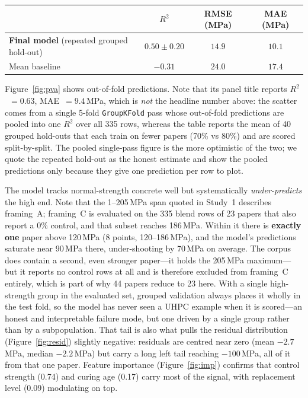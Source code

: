 \documentclass[11pt]{article}
\newcommand{\R}{$R^2$}
\begin{document}
\begin{center}\small
\begin{tabular}{lccc}
\toprule
 & \R{} & RMSE (MPa) & MAE (MPa) \\
\midrule
\textbf{Final model} (repeated grouped hold-out) & $\mathbf{0.50\pm0.20}$ & $\mathbf{14.9}$ & $\mathbf{10.1}$ \\
Mean baseline & $-0.31$ & $24.0$ & $17.4$ \\
\bottomrule
\end{tabular}
\end{center}

Figure~\ref{fig:pva} shows out-of-fold predictions. Note that its panel title reports
\R{}~$=0.63$, MAE~$=9.4$\,MPa, which is \emph{not} the headline number above: the
scatter comes from a single 5-fold \texttt{GroupKFold} pass whose out-of-fold
predictions are pooled into one \R{} over all 335 rows, whereas the table reports the
mean of 40 grouped hold-outs that each train on fewer papers (70\% vs 80\%) and are
scored split-by-split. The pooled single-pass figure is the more optimistic of the two;
we quote the repeated hold-out as the honest estimate and show the pooled predictions
only because they give one prediction per row to plot.

The model tracks normal-strength concrete well but systematically
\emph{under-predicts} the high end. Note that the 1--205\,MPa span quoted in Study~1
describes framing~A; framing~C is evaluated on the 335 blend rows of 23 papers that
also report a 0\% control, and that subset reaches 186\,MPa. Within it there is
\textbf{exactly one} paper above 120\,MPa (8 points, 120--186\,MPa), and the model's
predictions saturate near 90\,MPa there, under-shooting by 70\,MPa on average. The
corpus does contain a second, even stronger paper---it holds the 205\,MPa maximum---but
it reports no control rows at all and is therefore excluded from framing~C entirely,
which is part of why 44 papers reduce to 23 here. With a single high-strength group in
the evaluated set, grouped validation always places it wholly in the test fold, so the
model has never seen a UHPC example when it is scored---an honest and interpretable
failure mode, but one driven by a single group rather than by a subpopulation. That
tail is also what pulls
the residual distribution (Figure~\ref{fig:resid}) slightly negative: residuals are
centred near zero (mean $-2.7$\,MPa, median $-2.2$\,MPa) but carry a long left tail
reaching $-100$\,MPa, all of it from that one paper. Feature importance
(Figure~\ref{fig:imp}) confirms that control strength (0.74) and curing age (0.17)
carry most of the signal, with replacement level (0.09) modulating on top.
\end{document}
